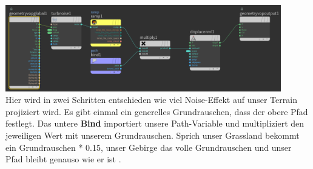 \documentclass[paper=a4,fontsize=12pt,ngerman]{scrartcl}
\begin{document}
\begin{enumerate}
		\includegraphics*[width=0.9\textwidth]{graphics/Nedim1.png}\\
		Hier wird in zwei Schritten entschieden wie viel Noise-Effekt auf unser Terrain projiziert wird. Es gibt einmal ein generelles Grundrauschen, dass der obere Pfad festlegt. Das untere \textbf{Bind} importiert unsere Path-Variable und multipliziert den jeweiligen Wert mit unserem Grundrauschen. Sprich unser Grassland bekommt ein Grundrauschen * 0.15, unser Gebirge das volle Grundrauschen und unser Pfad bleibt genauso wie er ist .
		

\end{enumerate}
\end{document}
